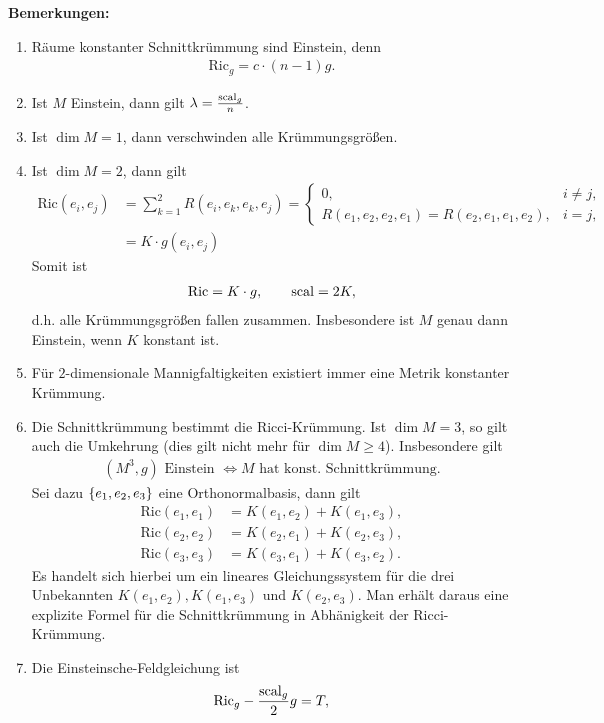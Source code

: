 \documentclass[12pt,a4paper]{article}
\def\Ric{\mathrm{Ric}}
\begin{document}
{\bf Bemerkungen:}
\begin{enumerate}
  \item R\"aume konstanter Schnittkr\"ummung sind Einstein, denn
\begin{align*}
\Ric_g = c\cdot (n-1)g.
\end{align*}
\item Ist $M$ Einstein, dann gilt $\lambda = \frac{\mathrm{scal}_g}{n}$.
\item Ist $\dim M = 1$, dann verschwinden alle Kr\"ummungsgr\"o\ss{}en.
\item Ist $\dim M = 2$, dann gilt
\begin{align*}
\Ric(e_i,e_j) &= \sum_{k=1}^2 R(e_i,e_k,e_k,e_j)
= 
\begin{cases}
0, & i\neq j,\\
R(e_1,e_2,e_2,e_1)=R(e_2,e_1,e_1,e_2), & i=j,
\end{cases}\\
&= K \cdot g(e_i,e_j)
\end{align*}
Somit ist
\begin{align*}
\Ric = K\cdot g,\qquad
\scal = 2K,
\end{align*}
d.h. alle Kr\"ummungsgr\"o\ss{}en fallen zusammen. Insbesondere ist $M$ genau
dann Einstein, wenn $K$ konstant ist.
\item F\"ur $2$-dimensionale Mannigfaltigkeiten existiert immer eine Metrik 
konstanter Kr\"ummung.
\item Die Schnittkr\"ummung bestimmt die Ricci-Kr\"ummung. Ist $\dim M = 3$, so gilt
auch die Umkehrung (dies gilt nicht mehr f\"ur $\dim M\ge 4$). Insbesondere gilt
\begin{align*}
(M^3,g) \text{ Einstein } \Leftrightarrow M\text{ hat konst. Schnittkr\"ummung}.
\end{align*}
Sei dazu $\{e_1,e_2,e_3\}$ eine Orthonormalbasis, dann gilt
\begin{align*}
\Ric(e_1,e_1) &= K(e_1,e_2) + K(e_1,e_3),\\
\Ric(e_2,e_2) &= K(e_2,e_1) + K(e_2,e_3),\\
\Ric(e_3,e_3) &= K(e_3,e_1) + K(e_3,e_2).
\end{align*}
Es handelt sich hierbei um ein lineares Gleichungssystem f\"ur die drei
Unbekannten $K(e_1,e_2),K(e_1,e_3)$ und $K(e_2,e_3)$. Man erh\"alt daraus eine
explizite Formel f\"ur die Schnittkr\"ummung in Abh\"anigkeit der Ricci-Kr\"ummung.
\item Die Einsteinsche-Feldgleichung ist
\begin{align*}
\Ric_g - \frac{\scal_g}{2}g = T,

\end{align*}
\end{enumerate}
\end{document}
